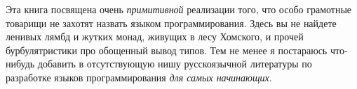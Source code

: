
Эта книга посвящена очень \emph{примитивной} реализации того, что особо
грамотные товарищи не захотят назвать языком программирования. Здесь вы не
найдете ленивых лямбд и жутких монад, живущих в лесу Хомского, и прочей
бурбулятристики про обощенный вывод типов. Тем не менее я постараюсь что-нибудь
добавить в отсутствующую нишу русскоязычной литературы по разработке языков
программирования \emph{для самых начинающих}.
